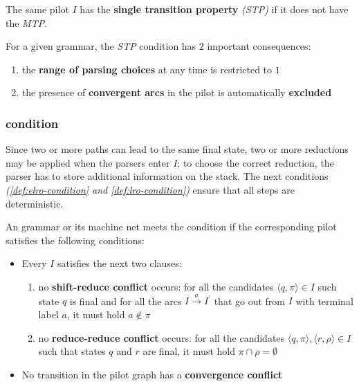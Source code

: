 \documentclass[english]{article}
\begin{document}
\begin{definition}
  \label{def:single-transition-property}
  The same pilot \mstate \(I\) has the \textbf{single transition property} \textit{(STP)} if it does not have the \textit{MTP}.
\end{definition}

For a given grammar, the \textit{STP} condition has \(2\) important consequences:

\begin{enumerate}
  \item the \textbf{range of parsing choices} at any time is restricted to \textbf{\(1\)}
  \item the presence of \textbf{convergent arcs} in the pilot is automatically \textbf{excluded}
\end{enumerate}

\subsubsection[ELR(1) condition]{\elro condition}
\label{sec:elro-condition}

Since two or more paths can lead to the same final state, two or more reductions may be applied when the parsers enter \mstate \(I\);
to choose the correct reduction, the parser has to store additional information on the stack.
The next conditions \textit{(\ref{def:elro-condition} and \ref{def:lro-condition})} ensure that all steps are deterministic.

\begin{definition}
  \label{def:elro-condition}
  An \EBNF grammar or its machine net meets the condition \textbf{\elro} if the corresponding pilot satisfies the following conditions:
  \begin{itemize}
    \item Every \mstate \(I\) satisfies the next two clauses:
          \begin{enumerate}
            \item no \textbf{shift-reduce conflict} occurs: for all the candidates \(\langle q, \pi \rangle \in I\) such state \(q\) is final and for all the arcs \(I \xrightarrow{a} I^\prime\) that go out from \(I\) with terminal label \(a\), it must hold \(a \notin \pi\)
            \item no \textbf{reduce-reduce conflict} occurs: for all the candidates \(\langle q, \pi \rangle, \langle r, \rho \rangle \in I\) such that states \(q\) and \(r\) are final, it must hold \(\pi \cap \rho = \emptyset\)
          \end{enumerate}
    \item No transition in the pilot graph has a \textbf{convergence conflict}
  \end{itemize}
\end{definition}
\end{document}
